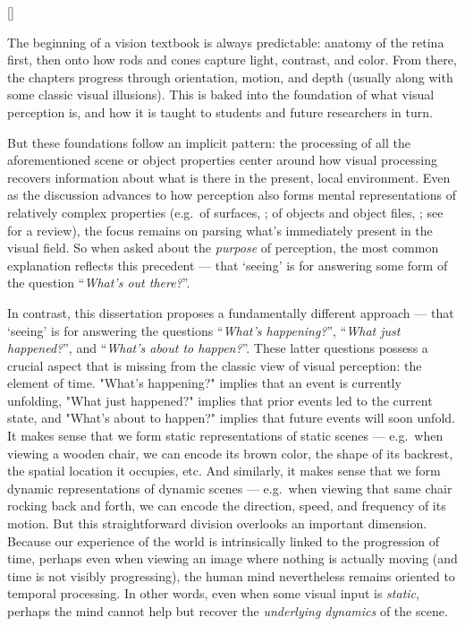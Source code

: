 []
\label{chap:intro}

The beginning of a vision textbook is always predictable: anatomy of the retina first, then onto how rods and cones capture light, contrast, and color.  From there, the chapters progress through orientation, motion, and depth (usually along with some classic visual illusions).  This is baked into the foundation of what visual perception is, and how it is taught to students and future researchers in turn. 

But these foundations follow an implicit pattern: the processing of all the aforementioned scene or object properties center around how visual processing recovers information about what is there in the present, local environment.  Even as the discussion advances to how perception also forms mental representations of relatively complex properties (e.g.~of surfaces, \cite{nakayama_visual_1995}; of objects and object files, \cite{kahneman_reviewing_1992}; see \cite{scholl_objects_2001} for a review), the focus remains on parsing what's immediately present in the visual field.  So when asked about the \textit{purpose} of perception, the most common explanation reflects this precedent --- that ‘seeing’ is for answering some form of the question “\textit{What’s out there?}”.   

In contrast, this dissertation proposes a fundamentally different approach --- that ‘seeing’ is for answering the questions “\textit{What’s happening?}”, “\textit{What just happened?}”, and “\textit{What’s about to happen?}”.  These latter questions possess a crucial aspect that is missing from the classic view of visual perception: the element of time. "What's happening?" implies that an event is currently unfolding, "What just happened?" implies that prior events led to the current state, and "What's about to happen?" implies that future events will soon unfold.  It makes sense that we form static representations of static scenes --- e.g.~when viewing a wooden chair, we can encode its brown color, the shape of its backrest, the spatial location it occupies, etc.  And similarly, it makes sense that we form dynamic representations of dynamic scenes --- e.g.~when viewing that same chair rocking back and forth, we can encode the direction, speed, and frequency of its motion. But this straightforward division overlooks an important dimension.  Because our experience of the world is intrinsically linked to the progression of time, perhaps even when viewing an image where nothing is actually moving (and time is not visibly progressing), the human mind nevertheless remains oriented to temporal processing. In other words, even when some visual input is \textit{static}, perhaps the mind cannot help but recover the \textit{underlying dynamics} of the scene.

